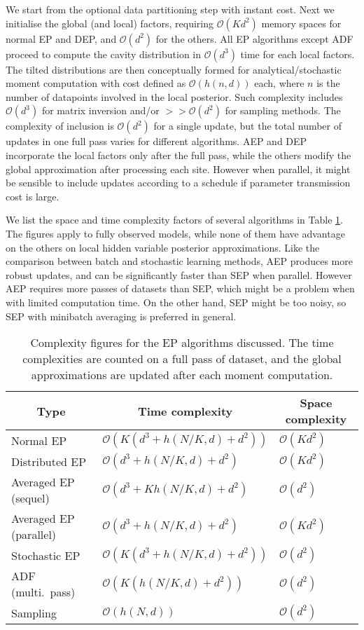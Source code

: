 We start from the optional data partitioning step with instant cost. Next we initialise the global (and local) factors, requiring $\mathcal{O}(Kd^2)$ memory spaces for normal EP and DEP, and $\mathcal{O}(d^2)$ for the others. All EP algorithms except ADF proceed to compute the cavity distribution in $\mathcal{O}(d^3)$ time for each local factors. The tilted distributions are then conceptually formed for analytical/stochastic moment computation with cost defined as $\mathcal{O}(h(n, d))$ each, where $n$ is the number of datapoints involved in the local posterior. Such complexity includes $\mathcal{O}(d^3)$ for matrix inversion and/or $ >> \mathcal{O}(d^2)$ for sampling methods. The complexity of inclusion is $\mathcal{O}(d^2)$ for a single update, but the total number of updates in one full pass varies for different algorithms. AEP and DEP incorporate the local factors only after the full pass, while the others modify the global approximation after processing each site. However when parallel, it might be sensible to include updates according to a schedule if parameter transmission cost is large.

We list the space and time complexity factors of several algorithms in Table \ref{table:complexity}. The figures apply to fully observed models, while none of them have advantage on the others on local hidden variable posterior approximations. Like the comparison between batch and stochastic learning methods, AEP produces more robust updates, and can be significantly faster than SEP when parallel. However AEP requires more passes of datasets than SEP, which might be a problem when with limited computation time. On the other hand, SEP might be too noisy, so SEP with minibatch averaging is preferred in general.

\begin{table}[t]
\caption{Complexity figures for the EP algorithms discussed. The time complexities are counted on a full pass of dataset, and the global approximations are updated after each moment computation. }
\label{table:complexity}
\begin{center}
\begin{tabular}{lll}
\multicolumn{1}{c}{\bf Type}  &\multicolumn{1}{c}{\bf Time complexity} &\multicolumn{1}{c}{\bf Space complexity}
\\ \hline 
Normal EP         		&$\mathcal{O}(K(d^3 + h(N/K, d) + d^2))$ 		&$\mathcal{O}(Kd^2)$ \\
Distributed EP        	&$\mathcal{O}(d^3 + h(N/K, d) + d^2)$			&$\mathcal{O}(Kd^2)$ \\
Averaged EP (sequel)     &$\mathcal{O}(d^3 + K h(N/K, d) + d^2)$ 		&$\mathcal{O}(d^2)$ \\
Averaged EP (parallel)   &$\mathcal{O}(d^3 + h(N/K, d) + d^2)$ 		&$\mathcal{O}(Kd^2)$ \\
Stochastic EP 			&$\mathcal{O}(K(d^3 + h(N/K, d) + d^2))$ 		&$\mathcal{O}(d^2)$ \\
ADF (multi.~pass) 		&$\mathcal{O}(K(h(N/K, d) + d^2))$ 		&$\mathcal{O}(d^2)$ \\
\hline
Sampling 				&$\mathcal{O}(h(N, d))$			&$\mathcal{O}(d^2)$
\end{tabular}
\end{center}
\end{table}